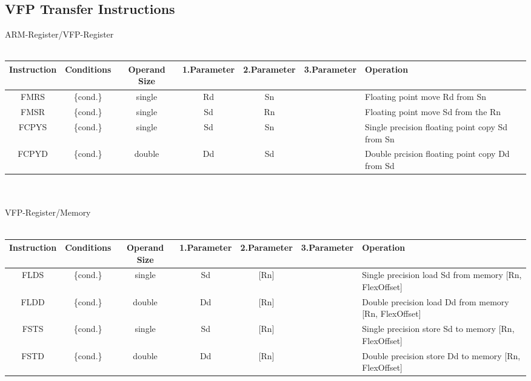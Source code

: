 \begin{landscape} 
\section{VFP Transfer Instructions}
{\rot ARM-Register/VFP-Register}\\
\\
\begin{tabular}{|c|c|c|c|c|c|l|}
\hline
Instruction & Conditions & Operand Size & 1.Parameter & 2.Parameter & 3.Parameter & Operation\\
\hline
FMRS & \{cond.\} & single & Rd & Sn &  & Floating point move Rd from Sn\\
\hline
FMSR & \{cond.\} & single & Sd & Rn &  & Floating point move Sd from the Rn\\
\hline
\hline
FCPYS & \{cond.\} & single & Sd & Sn &  & Single precision floating point copy Sd from Sn\\
\hline
FCPYD & \{cond.\} & double & Dd & Sd &  & Double prcision floating point copy Dd from Sd\\
\hline
\end{tabular}\\
\\

{\rot VFP-Register/Memory}\\
\\
\begin{tabular}{|c|c|c|c|c|c|l|}
\hline
Instruction & Conditions & Operand Size & 1.Parameter & 2.Parameter & 3.Parameter & Operation\\
\hline
FLDS & \{cond.\} & single & Sd & [Rn] &  & Single precision load Sd from memory [Rn, FlexOffset]\\
\hline
FLDD & \{cond.\} & double & Dd & [Rn] &  & Double precision load Dd from memory [Rn, FlexOffset]\\
\hline
\hline
FSTS & \{cond.\} & single & Sd & [Rn] &  & Single precision store Sd to memory [Rn, FlexOffset]\\
\hline
FSTD & \{cond.\} & double & Dd & [Rn] &  & Double precision store Dd to memory [Rn, FlexOffset]\\
\hline
\end{tabular}\\
\\


\end{landscape}
